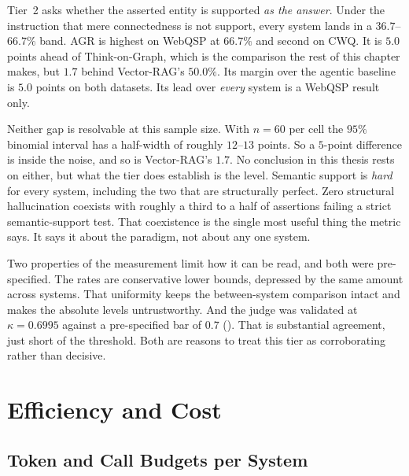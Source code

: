 Tier~2 asks whether the asserted entity is supported \emph{as the
answer}. Under the instruction that mere connectedness is
not support, every system lands in a $36.7$--$66.7\%$ band. AGR is highest on
WebQSP at $66.7\%$ and second on CWQ. It is $5.0$ points ahead of
Think-on-Graph, which is the comparison the rest of this chapter makes, but
$1.7$ behind Vector-RAG's $50.0\%$. Its margin over the agentic baseline is
$5.0$ points on both datasets. Its lead over \emph{every} system is a WebQSP
result only.

Neither gap is resolvable at this sample size. With $n = 60$ per cell the $95\%$
binomial interval has a half-width of roughly $12$--$13$ points. So a $5$-point
difference is inside the noise, and so is Vector-RAG's $1.7$. No conclusion in
this thesis rests on either, but what the tier does establish is the level.
Semantic support is \emph{hard} for every system, including the two that are
structurally perfect. Zero structural hallucination coexists with roughly a
third to a half of assertions failing a strict semantic-support test. That
coexistence is the single most useful thing the metric says. It says it about
the paradigm, not about any one system.

Two properties of the measurement limit how it can be read, and both were
pre-specified. The rates are conservative lower bounds, depressed by the same
amount across systems. That uniformity keeps the between-system comparison
intact and makes the absolute levels untrustworthy. And the judge was validated
at $\kappa = 0.6995$ against a pre-specified bar of $0.7$ ().
That is substantial agreement, just short of the threshold. Both are reasons to
treat this tier as corroborating rather than decisive.

\section{Efficiency and Cost}\label{sec:efficiency}

\subsection{Token and Call Budgets per System}

